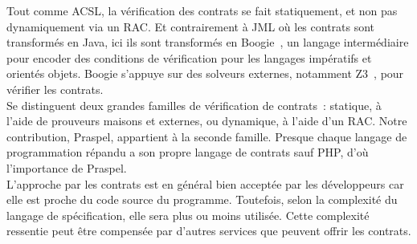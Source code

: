 Tout comme ACSL, la vérification des contrats se fait statiquement, et non pas
dynamiquement via un RAC. Et contrairement à JML où les contrats sont
transformés en Java, ici ils sont transformés en Boogie~,
un langage intermédiaire pour encoder des conditions de vérification pour les
langages impératifs et orientés objets. Boogie s'appuye sur des solveurs
externes, notamment Z3~, pour vérifier les contrats. \\

Se distinguent deux grandes familles de vérification de contrats~: statique, à
l'aide de prouveurs maisons et externes, ou dynamique, à l'aide d'un RAC. Notre
contribution, Praspel, appartient à la seconde famille.
Presque chaque langage de programmation répandu a son propre langage de contrats
sauf PHP, d'où l'importance de Praspel. \\

L'approche par les contrats est en général bien acceptée par les développeurs
car elle est proche du code source du programme.  Toutefois, selon la complexité
du langage de spécification, elle sera plus ou moins utilisée. Cette complexité
ressentie peut être compensée par d'autres services que peuvent offrir les
contrats.
